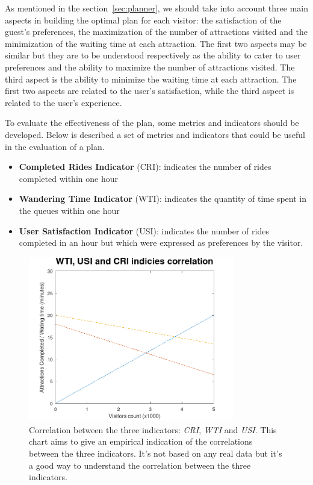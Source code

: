 As mentioned in the section~\ref{sec:planner}, we should take into account three main aspects in building the optimal plan for each visitor: the
satisfaction of the guest's preferences, the maximization of the number of attractions visited and the minimization of the waiting time at each
attraction. The first two aspects may be similar but they are to be understood respectively as the ability to cater to user preferences and the
ability to maximize the number of attractions visited. The third aspect is the ability to minimize the waiting time at each attraction. The first two
aspects are related to the user's satisfaction, while the third aspect is related to the user's experience.

To evaluate the effectiveness of the plan, some metrics and indicators should be developed. Below is described a set of metrics and indicators that
could be useful in the evaluation of a plan.

\begin{itemize}
	\item \textbf{Completed Rides Indicator} (CRI): indicates the number of rides completed within one hour
	\item \textbf{Wandering Time Indicator} (WTI): indicates the quantity of time spent in the queues within one hour
	\item \textbf{User Satisfaction Indicator} (USI): indicates the number of rides completed in an hour but which were expressed as preferences by the visitor.
\end{itemize}

\begin{figure}[H]
	\centering
	\includegraphics[width=0.8\textwidth]{img/indiciescorrelation.png}
	\caption{Correlation between the three indicators: \textit{CRI}, \textit{WTI} and \textit{USI}. This chart aims to give an empirical indication of the correlations between the three indicators. It's not based on any real data but it's a good way to understand the correlation between the three indicators.}
	\label{fig:indicies}
\end{figure}

